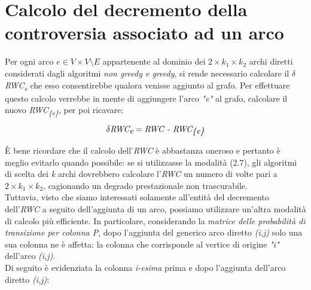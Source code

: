 \section{Calcolo del decremento della controversia associato ad un arco}

Per ogni arco \textit{$e \in V \times V \setminus E$} appartenente al dominio dei \textit{$2 \times k_1 \times k_2$} archi diretti considerati dagli algoritmi \textit{non greedy e greedy}, si rende necessario calcolare il \textit{$\delta$RWC\textsubscript{e}} che esso consentirebbe qualora venisse aggiunto al grafo. Per effettuare questo calcolo verrebbe in mente di aggiungere l'arco \textit{"e"} al grafo, calcolare il nuovo \textit{RWC\textsubscript{\{e\}}}, per poi ricavare: 

\begin{equation}
\textit{$\delta$RWC\textsubscript{e}} = \textit{RWC - RWC\textsubscript{\{e\}}}
\end{equation}

\`E bene ricordare che il calcolo dell'\textit{RWC} è abbastanza oneroso e pertanto è meglio evitarlo quando possibile: se si utilizzasse la modalità (2.7), gli algoritmi di scelta dei \textit{k} archi dovrebbero calcolare l'\textit{RWC} un numero di volte pari a \textit{$2 \times k_1 \times k_2$}, cagionando un degrado prestazionale non trascurabile.
\\Tuttavia, visto che siamo interessati solamente all'entità del decremento dell'\textit{RWC} a seguito dell'aggiunta di un arco, possiamo utilizzare un'altra modalità di calcolo più efficiente. In particolare, considerando la \textit{matrice delle probabilità di transizione per colonna P}, dopo l'aggiunta del generico arco diretto \textit{(i,j)} solo una sua colonna ne è affetta: la colonna che corrisponde al vertice di origine \textit{"i"} dell'arco \textit{(i,j)}.
\\Di seguito è evidenziata la colonna \textit{i-esima} prima e dopo l'aggiunta dell'arco diretto \textit{(i,j)}:

